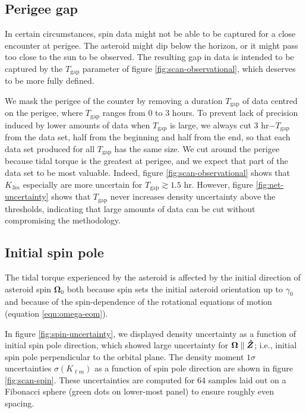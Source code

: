 


\subsection{Perigee gap}
\label{sec:scan-gap}
In certain circumstances, spin data might not be able to be captured for a close encounter at perigee. The asteroid might dip below the horizon, or it might pass too close to the sun to be observed. The resulting gap in data is intended to be captured by the $T_\text{gap}$ parameter of figure \ref{fig:scan-observational}, which deserves to be more fully defined.

We mask the perigee of the counter by removing a duration $T_\text{gap}$ of data centred on the perigee, where $T_\text{gap}$ ranges from 0 to 3 hours. To prevent lack of precision induced by lower amounts of data when $T_\text{gap}$ is large, we always cut 3 hr$-T_\text{gap}$ from the data set, half from the beginning and half from the end, so that each data set produced for all $T_\text{gap}$ has the same size. We cut around the perigee because tidal torque is the greatest at perigee, and we expect that part of the data set to be most valuable. Indeed, figure \ref{fig:scan-observational} shows that $K_{3m}$ especially are more uncertain for $T_\text{gap} \gtrsim 1.5$ hr. However, figure \ref{fig:net-uncertainty} shows that $T_\text{gap}$ never increases density uncertainty above the thresholds, indicating that large amounts of data can be cut without compromising the methodology.


\subsection{Initial spin pole}
\label{sec:scan-spin}

The tidal torque experienced by the asteroid is affected by the initial direction of asteroid spin $\bm \Omega_0$ both because spin sets the initial asteroid orientation up to $\gamma_0$ and because of the spin-dependence of the rotational equations of motion (equation \ref{eqn:omega-eom}).

In figure \ref{fig:spin-uncertainty}, we displayed density uncertainty as a function of initial spin pole direction, which showed large uncertainty for $\bm \Omega \parallel \bm{\hat{Z}}$; i.e., initial spin pole perpendicular to the orbital plane. The density moment $1\sigma$ uncertainties $\sigma(K_{\ell m})$ as a function of spin pole direction are shown in figure \ref{fig:scan-spin}. These uncertainties are computed for 64 samples laid out on a Fibonacci sphere (green dots on lower-most panel) to ensure roughly even spacing.

